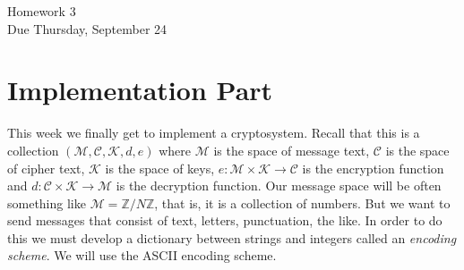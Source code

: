 \documentclass[11pt]{article}
\newcommand{\bZ}{\mathbb{Z}}
\newcommand{\cC}{\mathcal{C}}
\newcommand{\cK}{\mathcal{K}}
\newcommand{\cM}{\mathcal{M}}
\begin{document}
\begin{center}
\Large {Homework 3}\\
\small {Due Thursday, September 24}
\end{center}
\section*{Implementation Part}
This week we finally get to implement a cryptosystem.  Recall that this is a collection $(\cM,\cC,\cK,d,e)$ where $\cM$ is the space of message text, $\cC$ is the space of cipher text, $\cK$ is the space of keys, $e:\cM\times\cK\to\cC$ is the encryption function and $d:\cC\times\cK\to\cM$ is the decryption function.  Our message space will be often something like $\cM = \bZ/N\bZ$, that is, it is a collection of numbers.  But we want to send messages that consist of text, letters, punctuation, the like.  In order to do this we must develop a dictionary between strings and integers called an \textit{encoding scheme}.  We will use the ASCII encoding scheme.
\end{document}
